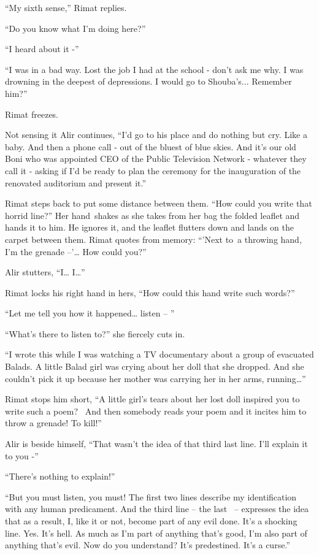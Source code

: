 \documentclass[twoside,11pt]{book}
\begin{document}
``My sixth sense,'' Rimat replies.

``Do you know what I'm doing here?''

``I heard about it -''

``I was in a bad way. Lost the job I had at the school - don't ask me why. I was drowning in the deepest of
depressions. I would go to Shouba's... Remember him?''

Rimat freezes.

Not sensing it Alir continues, ``I'd go to his place and do nothing but cry. Like a baby. And then a phone
call - out of the bluest of blue skies. And it's our old Boni who was appointed CEO of the Public Television Network -
whatever they call it - asking if I'd be ready to plan the ceremony for the inauguration of the renovated auditorium
and present it.''

Rimat steps back to put some distance between them. ``How could you write that horrid line?''
Her hand~shakes as she takes from her bag the folded leaflet and hands it to him. He ignores it, and the leaflet
flutters down and lands on the carpet between them. Rimat quotes from memory: ``'Next to~a throwing hand,
I'm the grenade --'{\dots} How could you?''

Alir stutters, ``I{\dots} I{\dots}''

Rimat locks his right hand in hers, ``How could this hand write such words?''

``Let me tell you how it happened{\dots} listen -- ''

``What's there to listen to?'' she fiercely cuts in.

``I wrote this while I was watching a TV documentary about a group of evacuated Balads. A little Balad girl
was crying about her doll that she dropped. And she couldn't pick it up because her mother was carrying her in her
arms, running{\dots}''

Rimat stops him short, ``A little girl's tears about her lost doll inspired you to write such a poem?~ And
then somebody reads your poem and it incites him to throw a grenade! To kill!''

Alir is beside himself, ``That wasn't the idea of that third last line. I'll explain it to you
-''

``There's nothing to explain!''

``But you must listen, you must! The first two lines describe my identification with any human predicament.
And the third line -- the last \ {}-- expresses the idea that as a result, I, like it or not, become part of any evil
done. It's a shocking line. Yes. It's hell. As much as I'm part of anything that's good, I'm also part of anything
that's evil. Now do you understand? It's predestined. It's a curse.''
\end{document}
